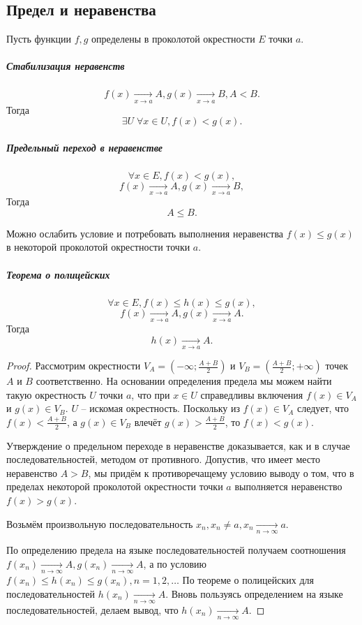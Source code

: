 \subsection{Предел и неравенства}
\begin{Theorem}
Пусть функции $f, g$ определены в проколотой окрестности $E$ точки $a$.

\subparagraph{Стабилизация неравенств}
$$f(x) \xrightarrow[x \rightarrow a]{} A, g(x) \xrightarrow[x \rightarrow a]{} B, A < B.$$
Тогда
$$\exists U \; \forall x \in U, f(x) < g(x).$$

\subparagraph{Предельный переход в неравенстве}
$$\forall x \in E, f(x) < g(x),$$
$$f(x) \xrightarrow[x \rightarrow a]{} A, g(x) \xrightarrow[x \rightarrow a]{} B,$$
Тогда
$$A \leq B.$$
\begin{Remark}
Можно ослабить условие и потребовать выполнения неравенства $f(x) \leq g(x)$ в некоторой проколотой окрестности точки $a$.
\end{Remark}

\subparagraph{Теорема о полицейских}
$$\forall x \in E, f(x) \leq h(x) \leq g(x),$$
$$f(x) \xrightarrow[x \rightarrow a]{} A, g(x) \xrightarrow[x \rightarrow a]{} A.$$
Тогда
$$h(x) \xrightarrow[x \rightarrow a]{} A.$$

\end{Theorem}
\begin{proof}
Рассмотрим окрестности $V_A = \left( -\infty;\frac{A+B}{2} \right)$ и $V_B = \left(\frac{A+B}{2};+\infty \right)$ точек $A$ и $B$ соответственно. На основании определения предела мы можем найти такую окрестность $U$ точки $a$, что при $x \in U$ справедливы включения $f(x) \in V_A$ и $g(x) \in V_B$. $U$ -- искомая окрестность. Поскольку из $f(x) \in V_A$ следует, что $f(x) < \frac{A+B}{2}$, а $g(x) \in V_B$ влечёт $g(x) > \frac{A+B}{2}$, то $f(x) < g(x)$.

Утверждение о предельном переходе в неравенстве доказывается, как и в случае последовательностей, методом от противного. Допустив, что имеет место неравенство $A > B$, мы придём к противоречащему условию выводу о том, что в пределах некоторой проколотой окрестности точки $a$ выполняется неравенство $f(x) > g(x)$.

Возьмём произвольную последовательность ${x_n}, x_n \neq a, x_n \xrightarrow[n \rightarrow \infty]{} a.$

По определению предела на языке последовательностей получаем соотношения $f(x_n) \xrightarrow[n \rightarrow \infty]{} A, g(x_n) \xrightarrow[n \rightarrow \infty]{} A$, а по условию $f(x_n) \leq h(x_n) \leq g(x_n), n = 1, 2, \ldots$ По теореме о полицейских для последовательностей $h(x_n) \xrightarrow[n \rightarrow \infty]{} A$. Вновь пользуясь определением на языке последовательностей, делаем вывод, что $h(x_n) \xrightarrow[n \rightarrow \infty]{} A$.
\end{proof}

